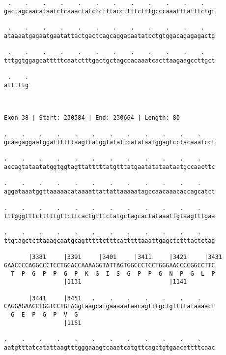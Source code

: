 \documentclass{article}
\begin{document}
\begin{Verbatim}
 .    .    .    .    .    .    .    .    .    .    .    .   
gactagcaacataatctcaaactatctctttaccttttctttgcccaaatttatttctgt
                                                            
 .    .    .    .    .    .    .    .    .    .    .    .   
ataaaatgagaatgaatattactgactcagcaggacaatatcctgtggacagagagactg
                                                            
 .    .    .    .    .    .    .    .    .    .    .    .   
tttggtggagcatttttcaatctttgactgctagccacaaatcacttaagaagccttgct
                                                            
 .    .
atttttg
       
       
 
Exon 38 | Start: 230584 | End: 230664 | Length: 80
 
.    .    .    .    .    .    .    .    .    .    .    .    
gcaagaggaatggattttttaagttatggtatattcatataatggagtcctacaaatcct
                                                            
.    .    .    .    .    .    .    .    .    .    .    .    
accagtataatatggtggtagttatttttatgtttatgaatatataataatgccaacttc
                                                            
.    .    .    .    .    .    .    .    .    .    .    .    
aggataaatggttaaaaacataaaattattattaaaaatagccaacaaacaccagcatct
                                                            
.    .    .    .    .    .    .    .    .    .    .    .    
tttgggtttctttttgttcttcactgtttctatgctagcactataaattgtaagtttgaa
                                                            
.    .    .    .    .    .    .    .    .    .    .    .    
ttgtagctcttaaagcaatgcagtttttctttcatttttaaattgagctctttactctag
                                                            
       |3381     |3391     |3401     |3411     |3421     |3431
GAACCCCAGGCCCTCCTGGACCAAAAGGTATTAGTGGCCCTCCTGGGAACCCCGGCCTTC
  T  P  G  P  P  G  P  K  G  I  S  G  P  P  G  N  P  G  L  P
                 |1131                         |1141        
  
       |3441     |3451   .    .    .    .    .    .    .    
CAGGAGAACCTGGTCCTGTAGgtaagcatgaaaaataacagtttgctgttttataaaact
  G  E  P  G  P  V  G                                       
                 |1151                                      
  
.    .    .    .    .    .    .    .    .    .    .    .    
aatgtttatcatattaagtttgggaaagtcaaatcatgttcagctgtgaacattttcaac
                                                            

\end{Verbatim}
\end{document}

